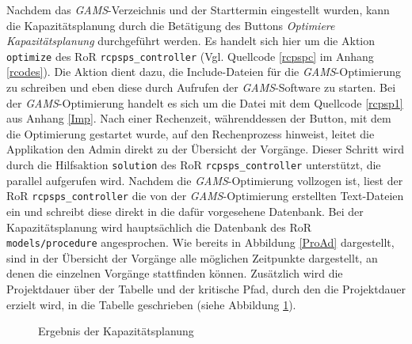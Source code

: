\documentclass[a4paper,12pt,parskip,bibtotoc,liststotoc]{article}
\begin{document}
Nachdem das \textit{GAMS}-Verzeichnis und der Starttermin eingestellt wurden, kann die Kapazitätsplanung durch die Betätigung des Buttons \textit{Optimiere Kapazitätsplanung} durchgeführt werden. Es handelt sich hier um die Aktion \texttt{optimize} des RoR \texttt{rcpsps\_controller} (Vgl. Quellcode \ref{rcpspc} im Anhang \ref{rcodes}). Die Aktion dient dazu, die Include-Dateien für die \textit{GAMS}-Optimierung zu schreiben und eben diese durch Aufrufen der \textit{GAMS}-Software zu starten. Bei der \textit{GAMS}-Optimierung handelt es sich um die Datei mit dem Quellcode \ref{rcpsp1} aus Anhang \ref{Imp}. Nach einer Rechenzeit, währenddessen der Button, mit dem die Optimierung gestartet wurde, auf den Rechenprozess hinweist, leitet die Applikation den Admin direkt zu der Übersicht der Vorgänge. Dieser Schritt wird durch die Hilfsaktion \texttt{solution} des RoR \texttt{rcpsps\_controller} unterstützt, die parallel aufgerufen wird. Nachdem die \textit{GAMS}-Optimierung vollzogen ist, liest der RoR \texttt{rcpsps\_controller} die von der \textit{GAMS}-Optimierung erstellten Text-Dateien ein und schreibt diese direkt in die dafür vorgesehene Datenbank. Bei der Kapazitätsplanung wird hauptsächlich die Datenbank des RoR \texttt{models/procedure} angesprochen. Wie bereits in Abbildung \ref{ProAd} dargestellt, sind in der Übersicht der Vorgänge alle möglichen Zeitpunkte dargestellt, an denen die einzelnen Vorgänge stattfinden können. Zusätzlich wird die Projektdauer über der Tabelle und der kritische Pfad, durch den die Projektdauer erzielt wird, in die Tabelle geschrieben (siehe Abbildung \ref{Kap}).\\
\begin{figure}[h!]
  \begin{center}
    \caption{Ergebnis der Kapazitätsplanung}  \label{Kap}
  \end{center}
\end{figure}
\end{document}
